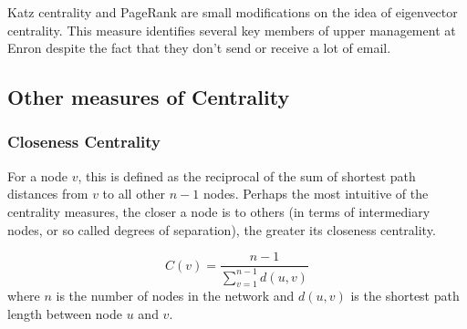 \documentclass[12pt]{article}
\begin{document}
	Katz centrality and PageRank are small modifications on the idea of eigenvector centrality. This measure identifies several key members of upper management at Enron despite the fact that they don't send or receive a lot of email.
	
	\subsection{Other measures of Centrality}
	
	\subsubsection{Closeness Centrality} For a node $v$, this is defined as the reciprocal of the sum of shortest path distances from $v$ to all other $n-1$ nodes. Perhaps the most intuitive of the centrality measures, the closer a node is to others (in terms of intermediary nodes, or so called degrees of separation), the greater its closeness centrality.
	
	\begin{equation}
			C(v) = \frac{n-1}{\sum\limits_{v=1}^{n-1} d(u,v)}
	\end{equation}
	where $n$ is the number of nodes in the network and $d(u,v)$ is the shortest path length between node $u$ and $v$.
\end{document}
